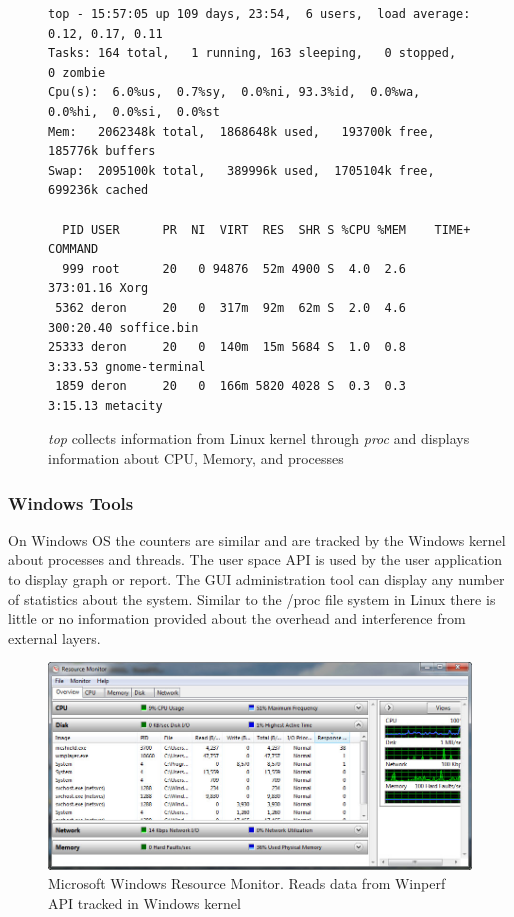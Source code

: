 \begin{figure}[h]
\begingroup
    \fontsize{10pt}{12pt}\selectfont
\begin{Verbatim}
top - 15:57:05 up 109 days, 23:54,  6 users,  load average: 0.12, 0.17, 0.11
Tasks: 164 total,   1 running, 163 sleeping,   0 stopped,   0 zombie
Cpu(s):  6.0%us,  0.7%sy,  0.0%ni, 93.3%id,  0.0%wa,  0.0%hi,  0.0%si,  0.0%st
Mem:   2062348k total,  1868648k used,   193700k free,   185776k buffers
Swap:  2095100k total,   389996k used,  1705104k free,   699236k cached

  PID USER      PR  NI  VIRT  RES  SHR S %CPU %MEM    TIME+  COMMAND            
  999 root      20   0 94876  52m 4900 S  4.0  2.6 373:01.16 Xorg               
 5362 deron     20   0  317m  92m  62m S  2.0  4.6 300:20.40 soffice.bin        
25333 deron     20   0  140m  15m 5684 S  1.0  0.8   3:33.53 gnome-terminal     
 1859 deron     20   0  166m 5820 4028 S  0.3  0.3   3:15.13 metacity           
\end{Verbatim}
\endgroup

\caption{\emph{top} collects information from Linux kernel through \emph{proc} and displays information about CPU, Memory, and processes}
\label{fig:top}
\end{figure}

\subsubsection{Windows Tools}
On Windows OS the counters are similar and are tracked by the Windows kernel about processes and threads.  The user space API \cite{winperf} is used by the user application to display graph or report. The GUI administration tool can display any number of statistics about the system.  Similar to the /proc file system in Linux there is little or no information provided about the overhead and interference from external layers.

\begin{figure}[!h]
  \begin{center}
  \includegraphics[width=6in]{images/ResourceMonitor.jpg}
  \caption{Microsoft Windows Resource Monitor.  Reads data from Winperf API tracked in Windows kernel}
  \label{resourceMonitor}
  \end{center}
\end{figure}


